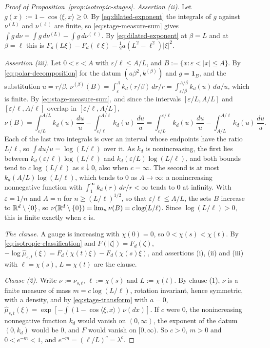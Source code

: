 \begin{proof}[Proof of Proposition~\ref{prop:isotropic-stages}]
\emph{Assertion (ii).} Let $g(x) := 1 - \cos\langle\xi,x\rangle \ge 0$. By
\ref{eq:dilated-exponent} the integrals of $g$ against $\nu^{(L)}$ and $\nu^{(\ell)}$ are finite,
so \ref{eq:stage-measure-sum} gives
$\int g\,d\nu = \int g\,d\nu^{(L)} - \int g\,d\nu^{(\ell)}$. By \ref{eq:dilated-exponent} at
$\beta = L$ and at $\beta = \ell$ this is
$F_d(L\xi) - F_d(\ell\xi) - \tfrac12 a(L^2 - \ell^2)|\xi|^2$.

\emph{Assertion (iii).} Let $0 < \varepsilon < A$ with $\varepsilon/\ell \le A/L$, and
$B := \{x : \varepsilon < |x| \le A\}$. By \ref{eq:polar-decomposition} for the datum
$(a\beta^2, k^{(\beta)})$ and $g = \mathbf 1_B$, and the substitution $u = r/\beta$,
$\nu^{(\beta)}(B) = \int_\varepsilon^A k_d(r/\beta)\,dr/r
= \int_{\varepsilon/\beta}^{A/\beta}k_d(u)\,du/u$, which is finite. By
\ref{eq:stage-measure-sum}, and since the intervals $[\varepsilon/L, A/L]$ and
$[\varepsilon/\ell, A/\ell]$ overlap in $[\varepsilon/\ell, A/L]$,
\[
  \nu(B) = \int_{\varepsilon/L}^{A/L}k_d(u)\,\frac{du}{u} - \int_{\varepsilon/\ell}^{A/\ell}k_d(u)\,\frac{du}{u}
         = \int_{\varepsilon/L}^{\varepsilon/\ell}k_d(u)\,\frac{du}{u}
           - \int_{A/L}^{A/\ell}k_d(u)\,\frac{du}{u} .
\]
Each of the last two integrals is over an interval whose endpoints have the ratio $L/\ell$, so
$\int du/u = \log(L/\ell)$ over it. As $k_d$ is nonincreasing, the first lies between
$k_d(\varepsilon/\ell)\log(L/\ell)$ and $k_d(\varepsilon/L)\log(L/\ell)$, and both bounds tend
to $c\log(L/\ell)$ as $\varepsilon \downarrow 0$, also when $c = \infty$. The second is at most
$k_d(A/L)\log(L/\ell)$, which tends to $0$ as $A \to \infty$: a nonincreasing nonnegative
function with $\int_1^\infty k_d(r)\,dr/r < \infty$ tends to $0$ at infinity. With
$\varepsilon = 1/n$ and $A = n$ for $n \ge (L/\ell)^{1/2}$, so that
$\varepsilon/\ell \le A/L$, the sets $B$ increase to $\mathbb{R}^d \setminus \{0\}$, so
$\nu(\mathbb{R}^d \setminus \{0\}) = \lim_n\nu(B) = c\log(L/\ell)$. Since $\log(L/\ell) > 0$, this is
finite exactly when $c$ is.

\emph{The clause.} A gauge is increasing with $\chi(0) = 0$, so
$0 < \chi(s) < \chi(t)$. By \ref{eq:isotropic-classification} and $F(|\zeta|) = F_d(\zeta)$,
$-\log\widehat\mu_{s,t}(\xi) = F_d(\chi(t)\xi) - F_d(\chi(s)\xi)$, and assertions (i), (ii) and
(iii) with $\ell = \chi(s)$, $L = \chi(t)$ are the clause.

\emph{Clause (2).} Write $\nu := \nu_{s,t}$, $\ell := \chi(s)$ and $L := \chi(t)$. By
clause (1), $\nu$ is a finite measure of mass
$m = c\log(L/\ell)$, rotation invariant, hence symmetric, with a density, and by
\ref{eq:stage-transform} with $a = 0$,
$\widehat\mu_{s,t}(\xi) = \exp[-\int(1 - \cos\langle\xi,x\rangle)\,\nu(dx)]$. If $c$ were $0$,
the nonincreasing nonnegative function $k_d$ would vanish on $(0,\infty)$, the exponent of the
datum $(0,k_d)$ would be $0$, and $F$ would vanish on $[0,\infty)$. So $c > 0$, $m > 0$ and
$0 < e^{-m} < 1$, and $e^{-m} = (\ell/L)^c = \lambda^c$.


\end{proof}
